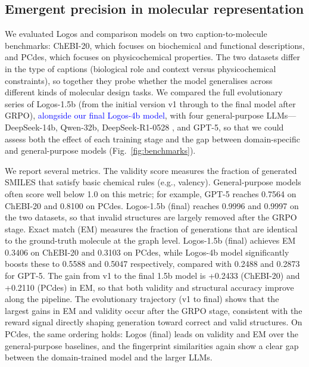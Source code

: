 \documentclass[11pt]{article}
\begin{document}
\subsection{Emergent precision in molecular representation}

We evaluated Logos and comparison models on two caption-to-molecule benchmarks: ChEBI-20\cite{edwards2022molt5,hastings2016chebi}, which focuses on biochemical and functional descriptions, and PCdes, which focuses on physicochemical properties. The two datasets differ in the type of captions (biological role and context versus physicochemical constraints), so together they probe whether the model generalises across different kinds of molecular design tasks. We compared the full evolutionary series of Logos-1.5b (from the initial version v1 through to the final model after GRPO), \textcolor{blue}{alongside our final Logos-4b model}, with four general-purpose LLMs---DeepSeek-14b\cite{deepseek2025r1}, Qwen-32b\cite{yang2025qwen3}, DeepSeek-R1-0528 \cite{deepseek2025r1}, and GPT-5, so that we could assess both the effect of each training stage and the gap between domain-specific and general-purpose models (Fig.~\ref{fig:benchmarks}).

We report several metrics. The validity score measures the fraction of generated SMILES that satisfy basic chemical rules (e.g., valency)\cite{preuer2018fcd}. General-purpose models often score well below 1.0 on this metric; for example, GPT-5 reaches 0.7564 on ChEBI-20 and 0.8100 on PCdes. Logos-1.5b (final) reaches 0.9996 and 0.9997 on the two datasets, so that invalid structures are largely removed after the GRPO stage. Exact match (EM) measures the fraction of generations that are identical to the ground-truth molecule at the graph level. Logos-1.5b (final) achieves EM 0.3406 on ChEBI-20 and 0.3103 on PCdes, while Logos-4b model significantly boosts these to 0.5588 and 0.5047 respectively, compared with 0.2488 and 0.2873 for GPT-5. The gain from v1 to the final 1.5b model is +0.2433 (ChEBI-20) and +0.2110 (PCdes) in EM, so that both validity and structural accuracy improve along the pipeline. The evolutionary trajectory (v1 to final) shows that the largest gains in EM and validity occur after the GRPO stage, consistent with the reward signal directly shaping generation toward correct and valid structures. On PCdes, the same ordering holds: Logos (final) leads on validity and EM over the general-purpose baselines, and the fingerprint similarities again show a clear gap between the domain-trained model and the larger LLMs.
\end{document}
